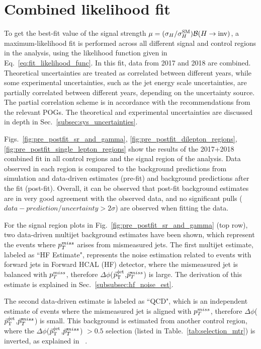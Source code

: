 \section{Combined likelihood fit}
\label{sec:sr_cr_fit}

\newcommand\resultPlotDir{merged_2023-04-08_vbfhinv_full_analysis_NLO_VJets_09Apr23_thesis_v1/plotsSRAndCRFit}

\graphicspath{{4_Results/Figures}}

To get the best-fit value of the signal strength $\mu=(\sigma_{H}/\sigma_{H}^{\mathrm{SM}}) {\mathcal{B}(H\rightarrow\text{inv})}$, a maximum-likelihood fit is performed
across all different signal and control regions in the analysis, using the likelihood function given 
in Eq.~\ref{eq:fit_likelihood_func}. In this fit, data from 2017 and 2018 are combined. Theoretical uncertainties
are treated as correlated between different years, while some experimental uncertainties, such as the jet energy
scale uncertainties, are partially correlated between different years, depending on the uncertainty source.
The partial correlation scheme is in accordance with the recommendations from the relevant POGs.
The theoretical and experimental uncertainties are discussed in depth in Sec.~\ref{subsec:sys_uncertainties}.

Figs.~\ref{fig:pre_postfit_sr_and_gamma}, \ref{fig:pre_postfit_dilepton_regions}, \ref{fig:pre_postfit_single_lepton_regions}
show the results of the 2017+2018 combined fit in all control regions and the signal region of the analysis.
Data observed in each region is compared to the background predictions from simulation and data-driven estimates (pre-fit) and
background predictions after the fit (post-fit). Overall, it can be observed that post-fit background
estimates are in very good agreement with the observed data, and no significant pulls 
($data - prediction / uncertainty > 2\sigma$) are observed when fitting the data. 

For the signal region plots in Fig.~\ref{fig:pre_postfit_sr_and_gamma} (top row), two data-driven multijet background estimates
have been shown, which represent the events where $p_T^{miss}$ arises from mismeasured jets. The first multijet estimate, labeled as ``HF Estimate", 
represents the noise estimation related to events with forward jets in Forward HCAL (HF) detector, where the mismeasured jet is balanced
with $p_T^{miss}$, therefore $\Delta\phi$(${\vec p}_{\mathrm{T}}^{\kern1pt\text{jet}}$,$\vec{p}_{T}^{miss}$) is large. The derivation of this estimate is explained in Sec.~\ref{subsubsec:hf_noise_est}.

The second data-driven estimate is labeled as ``QCD", which is an independent estimate of events where the mismeasured jet is aligned with $p_T^{miss}$,
therefore $\Delta\phi$(${\vec p}_{\mathrm{T}}^{\kern1pt\text{jet}}$,$\vec{p}_{T}^{miss}$) is small. This background is estimated from another control region, where the $\Delta\phi$(${\vec p}_{\mathrm{T}}^{\kern1pt\text{jet}}$,$\vec{p}_{T}^{miss}$)
$> 0.5$ selection (listed in Table.~\ref{tab:selection_mtr}) is inverted, as explained in ~\cite{VBFHinvAnalysisPaper}.

